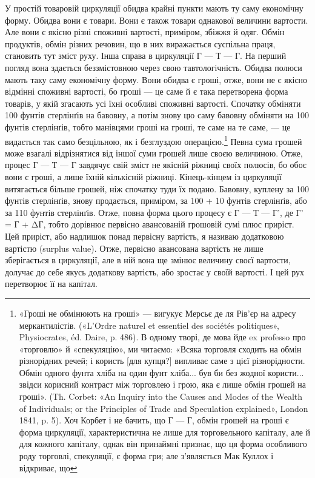 У простій товаровій циркуляції обидва крайні пункти мають
ту саму економічну форму. Обидва вони є товари. Вони є також
товари однакової величини вартости. Але вони є якісно різні
споживні вартості, приміром, збіжжя й одяг. Обмін продуктів,
обмін різних речовин, що в них виражається суспільна праця,
становить тут зміст руху. Інша справа в циркуляції Г — Т — Г.
На перший погляд вона здається беззмістовною через свою тавтологічність.
Обидва полюси мають таку саму економічну форму.
Вони обидва є гроші, отже, вони не є якісно відмінні споживні
вартості, бо гроші — це саме й є така перетворена форма товарів,
у якій згасають усі їхні особливі споживні вартості. Спочатку
обміняти 100 фунтів стерлінґів на бавовну, а потім знову цю саму
бавовну обміняти на 100 фунтів стерлінґів, тобто манівцями
гроші на гроші, те саме на те саме, — це видається так само безцільною,
як і безглуздою операцією.\footnote{
«Гроші не обмінюють на гроші» — вигукує Мерсьє де ля Рів’єр
на адресу меркантилістів. («L’Ordre naturel et essentiel des sociétés politiques»,
Physiocrates, éd. Daire, p. 486). В одному творі, де мова йде
ex professo про «торговлю» й «спекуляцію», ми читаємо: «Всяка торговля
сходить на обмін різнорідних речей; і користь [для купця?] випливає
саме з цієї різнорідности. Обмін одного фунта хліба на один фунт хліба...
був би без жодної користи... звідси корисний контраст між торговлею
і грою, яка є лише обмін грошей на гроші». (Th. Corbet: «An Inquiry
into the Causes and Modes of the Wealth of Individuals; or the Principles
of Trade and Speculation explained», London 1841, p. 5). Хоч Корбет і не
бачить, що Г — Г, обмін грошей на гроші є форма циркуляції, характеристична
не лише для торговельного капіталу, але й для кожного капіталу,
однак він принаймні признає, що ця форма особливого роду торговлі,
спекуляції, є форма гри; але з’являється Мак Куллох і відкриває, що
} Певна сума грошей може
взагалі відрізнятися від іншої суми грошей лише своєю величиною.
Отже, процес Г — Т — Г завдячує свій зміст не якісній
ріжниці своїх полюсів, бо обоє вони є гроші, а лише їхній кількісній
ріжниці. Кінець-кінцем із циркуляції витягається більше
грошей, ніж спочатку туди їх подано. Бавовну, куплену за 100
фунтів стерлінґів, знову продається, приміром, за 100 + 10 фунтів
стерлінґів, або за 110 фунтів стерлінґів. Отже, повна форма
цього процесу є Г — Т — Г', де Г' = Г + ΔГ, тобто дорівнює
первісно авансованій грошовій сумі плюс приріст. Цей приріст,
або надлишок понад первісну вартість, я називаю додатковою
вартістю (surplus value). Отже, первісно авансована вартість не
лише зберігається в циркуляції, але в ній вона ще змінює величину
своєї вартости, долучає до себе якусь додаткову вартість,
або зростає у своїй вартості. І цей рух перетворює її на
капітал.

